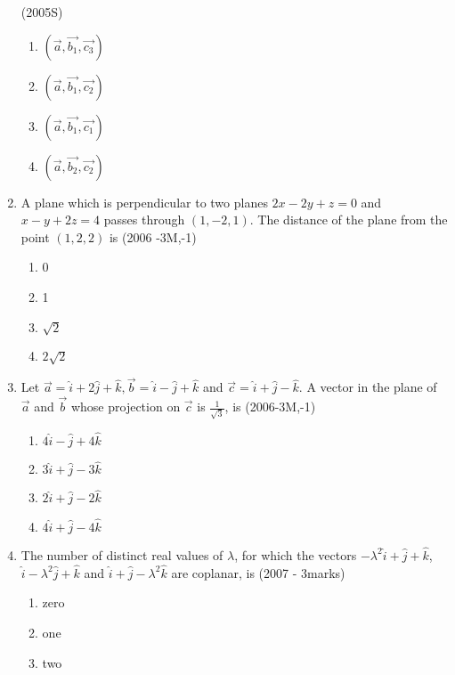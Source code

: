 \documentclass[journal,12pt,twocolumn]{IEEEtran}
\theoremstyle{remark}
\begin{document}
\begin{enumerate}
    \hfill{(2005S)}
    \begin{multicols}{2}
    \begin{enumerate}
    \item $(\vec{a}, \vec{b_1}, \vec{c_3})$
    \item $(\vec{a}, \vec{b_1}, \vec{c_2})$
    \item $(\vec{a}, \vec{b_1}, \vec{c_1})$
    \item $(\vec{a}, \vec{b_2}, \vec{c_2})$
    \end{enumerate}
    \end{multicols}
    \item A plane which is perpendicular to two planes $2x-2y+z=0$ and $x-y+2z=4$ passes through $(1,-2,1)$. The distance of the plane from the point $(1,2,2)$ is
    \hfill{(2006 -3M,-1)}
    \begin{multicols}{2} 
    \begin{enumerate}
    \item 0
    \item 1
    \item $\sqrt{2}$
    \item $2\sqrt{2}$
    \end{enumerate}
    \end{multicols}
    \item Let $\vec{a} = \hat{i} + 2\hat{j} + \hat{k}, \vec{b} = \hat{i}-\hat{j}+\hat{k}$ and $\vec{c}= \hat{i}+\hat{j}-\hat{k}$. A vector in the plane of $\vec{a}$ and $\vec{b}$ whose projection on $\vec{c}$ is $\frac{1}{\sqrt{3}}$, is
    \hfill{(2006-3M,-1)}
    \begin{enumerate}
    \item $4\hat{i} - \hat{j} + 4\hat{k}$
    \item $3\hat{i} + \hat{j} - 3\hat{k}$
    \item $2\hat{i} + \hat{j} - 2\hat{k}$
    \item $4\hat{i} + \hat{j} - 4\hat{k}$
    \end{enumerate}
    \item The number of distinct real values of $\lambda$, for which the vectors $-\lambda^{2}\hat{i} + \hat{j} + \hat{k}$, $\hat{i} - \lambda^{2}\hat{j} + \hat{k}$ and $\hat{i} + \hat{j} - \lambda^{2}\hat{k}$ are coplanar, is
    \hfill{(2007 - 3marks)}
    \begin{multicols}{2} 
    \begin{enumerate}
    \item zero
    \item one 
    \item two 

\end{enumerate}
\end{multicols}
\end{enumerate}
\end{document}
